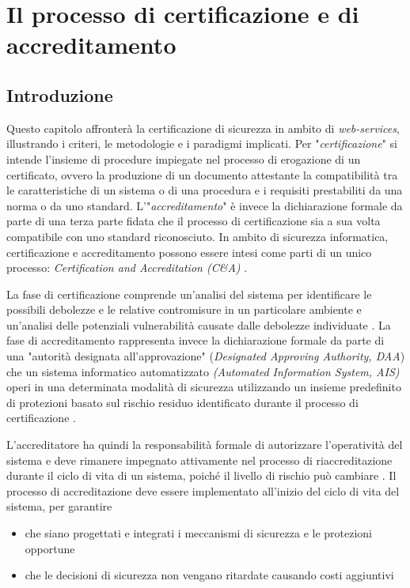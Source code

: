 \chapter{Il processo di certificazione e di accreditamento}
\section{Introduzione}
Questo capitolo affronterà la certificazione di sicurezza in ambito di \textit{web-services}, illustrando i criteri, le metodologie e i paradigmi implicati.
Per "\textit{certificazione}" si intende l'insieme di procedure impiegate nel processo di erogazione di un certificato, ovvero la produzione di un documento attestante la compatibilità tra le caratteristiche di un sistema o di una procedura e i requisiti prestabiliti da una norma o da uno standard.
L'"\textit{accreditamento}" è invece la dichiarazione formale da parte di una terza parte fidata che il processo di certificazione sia a sua volta compatibile con uno standard riconosciuto.
In ambito di sicurezza informatica, certificazione e accreditamento possono essere intesi come parti di un unico processo: \textit{Certification and Accreditation (C\&A)} \cite{NistCAHandbook}.

La fase di certificazione comprende un'analisi del sistema per identificare le possibili debolezze e le relative contromisure in un particolare ambiente e un'analisi delle potenziali vulnerabilità causate dalle debolezze individuate \cite{NistCAHandbook}.
La fase di accreditamento rappresenta invece la dichiarazione formale da parte di una "autorità designata all'approvazione" (\textit{Designated Approving Authority, DAA}) che un sistema informatico  automatizzato \textit{(Automated Information System, AIS)} operi in una determinata modalità di sicurezza utilizzando un insieme predefinito di protezioni basato sul rischio residuo identificato durante il processo di certificazione \cite{NistCAHandbook}.

L'accreditatore ha quindi la responsabilità formale di autorizzare l'operatività del sistema e deve rimanere impegnato attivamente nel processo di riaccreditazione durante il ciclo di vita di un sistema, poiché il livello di rischio può cambiare \cite{NistCAHandbook}.
Il processo di accreditazione deve essere implementato all'inizio del ciclo di vita del sistema, per garantire
\begin{itemize}
\item che siano progettati e integrati i meccanismi di sicurezza e le protezioni opportune
\item che le decisioni di sicurezza non vengano ritardate causando costi aggiuntivi
\end{itemize}


